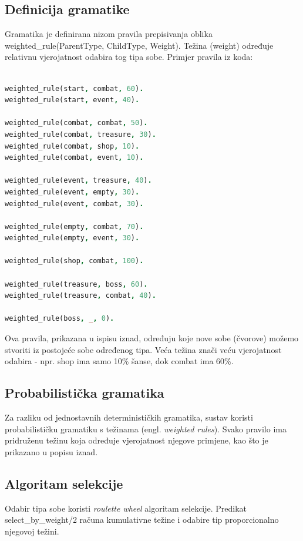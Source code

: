 \documentclass[]{foi}
\begin{document}
\subsection{Definicija gramatike}
Gramatika je definirana nizom pravila prepisivanja oblika weighted\_rule(ParentType, ChildType, Weight). Težina (weight) određuje relativnu vjerojatnost odabira tog tipa sobe. Primjer pravila iz koda:
\begin{lstlisting}[caption={Primjer gramatičkih pravila}, label={lst:grammar_rules}, language=Prolog, frame=single]
%% weighted_rule(ParentType, ChildType, Weight)

weighted_rule(start, combat, 60).
weighted_rule(start, event, 40).

weighted_rule(combat, combat, 50).
weighted_rule(combat, treasure, 30).
weighted_rule(combat, shop, 10).
weighted_rule(combat, event, 10).

weighted_rule(event, treasure, 40).
weighted_rule(event, empty, 30).
weighted_rule(event, combat, 30).

weighted_rule(empty, combat, 70).
weighted_rule(empty, event, 30).

weighted_rule(shop, combat, 100).

weighted_rule(treasure, boss, 60).
weighted_rule(treasure, combat, 40).

weighted_rule(boss, _, 0).
\end{lstlisting}

Ova pravila, prikazana u ispisu iznad, određuju koje nove sobe (čvorove) možemo stvoriti iz postojeće sobe određenog tipa. Veća težina znači veću vjerojatnost odabira - npr. shop ima samo 10\% šanse, dok combat ima 60\%.

\subsection{Probabilistička gramatika}
Za razliku od jednostavnih determinističkih gramatika, sustav koristi probabilističku gramatiku s težinama (engl. \textit{weighted rules}). Svako pravilo ima pridruženu težinu koja određuje vjerojatnost njegove primjene, kao što je prikazano u popisu iznad.

\subsection{Algoritam selekcije}
Odabir tipa sobe koristi \textit{roulette wheel} algoritam selekcije. Predikat select\_by\_weight/2 računa kumulativne težine i odabire tip proporcionalno njegovoj težini.
\end{document}
